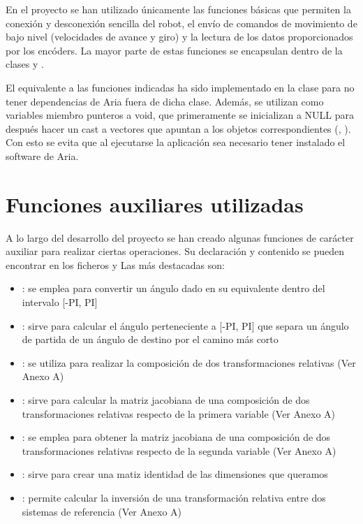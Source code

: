 En el proyecto se han utilizado únicamente las funciones básicas que permiten la conexión y desconexión sencilla del robot, el envío de comandos de movimiento de bajo nivel (velocidades de avance y giro) y la lectura de los datos proporcionados por los encóders. La mayor parte de estas funciones se encapsulan dentro de la clases  y .

El equivalente a las funciones indicadas ha sido implementado en la clase  para no tener dependencias de Aria fuera de dicha clase.
Además, se utilizan como variables miembro punteros a void, que primeramente se inicializan a NULL para después hacer un cast a vectores que apuntan a los objetos correspondientes (, ). Con esto se evita que al ejecutarse la aplicación sea necesario tener instalado el software de Aria.

\section{Funciones auxiliares utilizadas}
A lo largo del desarrollo del proyecto se han creado algunas funciones de carácter auxiliar para realizar ciertas operaciones. Su declaración y contenido se pueden encontrar en los ficheros  y  Las más destacadas son:

\begin{itemize}
  \item {}: se emplea para convertir un ángulo dado en su equivalente dentro del intervalo [-PI, PI]
  \item {}: sirve para calcular el ángulo perteneciente a [-PI, PI] que separa un ángulo de partida de un ángulo de destino por el camino más corto
  \item {}: se utiliza para realizar la composición de dos transformaciones relativas (Ver Anexo A)
  \item {}: sirve para calcular la matriz jacobiana de una composición de dos transformaciones relativas respecto de la primera variable (Ver Anexo A)
  \item {}: se emplea para obtener la matriz jacobiana de una composición de dos transformaciones relativas respecto de la segunda variable (Ver Anexo A)
  \item {}: sirve para crear una matiz identidad de las dimensiones que queramos
  \item {}: permite calcular la inversión de una transformación relativa entre dos sistemas de referencia (Ver Anexo A)
\end{itemize}

